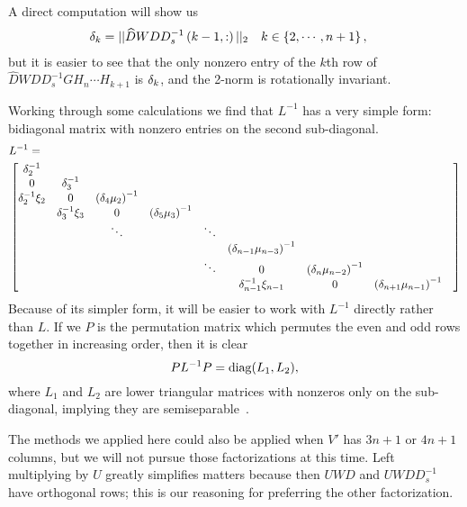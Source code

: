 \noindent
A direct computation will show us
%
\begin{align}
    \delta_{k} &= ||\widehat{D}WDD_{s}^{-1}\left( k-1,: \right)||_{2}
        \quad k\in\left\{ 2,\cdots,n+1 \right\},
\end{align}
%
but it is easier to see that the only nonzero entry of the $k$th row
of $\widehat{D}WDD_{s}^{-1}GH_{n}\cdots H_{k+1}$ is $\delta_{k}$, and
the 2-norm is rotationally invariant.

Working through some calculations we find that $L^{-1}$ has a very simple
form: bidiagonal matrix with nonzero entries on the second sub-diagonal.
%
\begin{align}
    &L^{-1} = \nonumber\\
    &\begin{bmatrix}
        \delta_{2}^{-1} & & & & & & & & \\
        0 & \delta_{3}^{-1}& & & & & & & \\
        \delta_{2}^{-1}\xi_{2} & 0 & \left( \delta_{4}\mu_{2} \right)^{-1} 
            & & & & & \\
        & \delta_{3}^{-1}\xi_{3} & 0 & \left( \delta_{5}\mu_{3} \right)^{-1}
            & & & & & \\
        & & \ddots & & \ddots & & & & \\
        & & & & & \left( \delta_{n-1}\mu_{n-3} \right)^{-1} & & \\
        & & & & \ddots & 0 & 
            \left( \delta_{n}\mu_{n-2} \right)^{-1} & \\
        & & & & & \delta_{n-1}^{-1}\xi_{n-1} & 0 &
            \left( \delta_{n+1}\mu_{n-1} \right)^{-1} \\
    \end{bmatrix}
\end{align}
%
Because of its simpler form, it will be easier to work with $L^{-1}$ directly
rather than $L$.
If we $P$ is the permutation matrix which permutes the even and odd
rows together in increasing order, then it is clear
%
\begin{equation}
    PL^{-1}P = \operatorname{diag}(L_{1},L_{2}),
\end{equation}
%
where $L_{1}$ and $L_{2}$ are lower triangular matrices
with nonzeros only on the sub-diagonal, implying they are
semiseparable~\cite[Chapter 12]{gvl4}.

The methods we applied here could also be applied when $V'$
has $3n+1$ or $4n+1$ columns, but we will not pursue those factorizations
 at this time.
Left multiplying by $U$ greatly simplifies matters because
then $UWD$ and $UWDD_{s}^{-1}$ have orthogonal rows;
this is our reasoning for preferring the other factorization.



